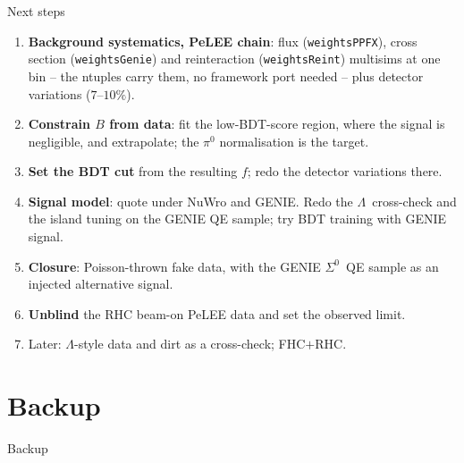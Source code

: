 \documentclass[aspectratio=169,10pt]{beamer}
\newif\ifbackup
\newcommand{\Szero}{\ensuremath{\Sigma^{0}}}
\newcommand{\Lam}{\ensuremath{\Lambda}}
\begin{document}
\begin{frame}{Next steps}
  \begin{enumerate}
    \item \textbf{Background systematics, PeLEE chain}: flux (\texttt{weightsPPFX}), cross
          section (\texttt{weightsGenie}) and reinteraction (\texttt{weightsReint})
          multisims at one bin -- the ntuples carry them, no framework port needed --
          plus detector variations ($7$--$10\%$).
    \item \textbf{Constrain $B$ from data}: fit the low-BDT-score region, where the
          signal is negligible, and extrapolate; the $\pi^0$ normalisation is the target.
    \item \textbf{Set the BDT cut} from the resulting $f$; redo the detector variations
          there.
    \item \textbf{Signal model}: quote under NuWro and GENIE. Redo the \Lam\ cross-check
          and the island tuning on the GENIE QE sample; try BDT training with GENIE signal.
    \item \textbf{Closure}: Poisson-thrown fake data, with the GENIE \Szero\ QE sample as
          an injected alternative signal.
    \item \textbf{Unblind} the RHC beam-on PeLEE data and set the observed limit.
    \item Later: \Lam-style data and dirt as a cross-check; FHC$+$RHC.
  \end{enumerate}
  \label{mainend}
\end{frame}

\backuptrue
\appendix
\section*{Backup}

{
\begin{frame}[plain]
  \begin{center}\Huge\color{ubred} Backup\end{center}
\end{frame}}
\end{document}
